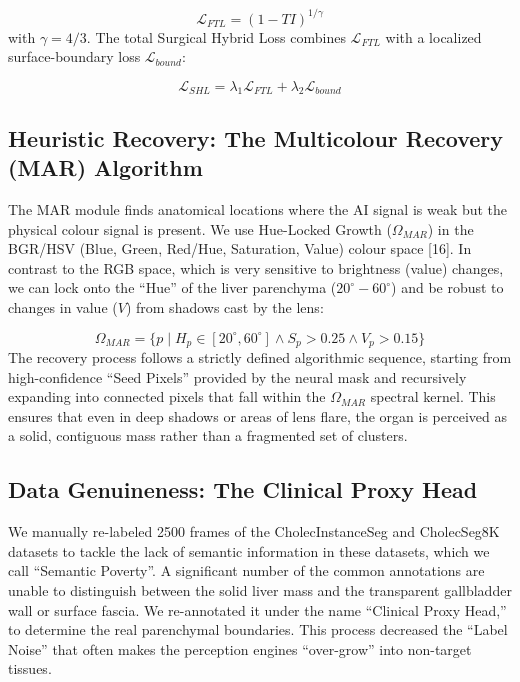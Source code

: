 \documentclass[conference]{IEEEtran}
\begin{document}
\begin{equation}
\mathcal{L}_{FTL} = (1 - TI)^{1/\gamma}
\end{equation}
with $\gamma = 4/3$. The total Surgical Hybrid Loss combines $\mathcal{L}_{FTL}$ with a localized surface-boundary loss $\mathcal{L}_{bound}$:

\begin{equation}
\mathcal{L}_{SHL} = \lambda_1 \mathcal{L}_{FTL} + \lambda_2 \mathcal{L}_{bound}
\end{equation}

\subsection{Heuristic Recovery: The Multicolour Recovery (MAR) Algorithm}
The MAR module finds anatomical locations where the AI signal is weak but the physical colour signal is present. We use Hue-Locked Growth ($\Omega_{MAR}$) in the BGR/HSV (Blue, Green, Red/Hue, Saturation, Value) colour space [16]. In contrast to the RGB space, which is very sensitive to brightness (value) changes, we can lock onto the ``Hue'' of the liver parenchyma ($20^\circ - 60^\circ$) and be robust to changes in value ($V$) from shadows cast by the lens:

\begin{equation}
\Omega_{MAR} = \{ p \mid H_p \in [20^\circ, 60^\circ] \wedge S_p > 0.25 \wedge V_p > 0.15 \}
\end{equation}
The recovery process follows a strictly defined algorithmic sequence, starting from high-confidence ``Seed Pixels'' provided by the neural mask and recursively expanding into connected pixels that fall within the $\Omega_{MAR}$ spectral kernel. This ensures that even in deep shadows or areas of lens flare, the organ is perceived as a solid, contiguous mass rather than a fragmented set of clusters.

\subsection{Data Genuineness: The Clinical Proxy Head}
We manually re-labeled 2500 frames of the CholecInstanceSeg and CholecSeg8K datasets to tackle the lack of semantic information in these datasets, which we call ``Semantic Poverty''. A significant number of the common annotations are unable to distinguish between the solid liver mass and the transparent gallbladder wall or surface fascia. We re-annotated it under the name ``Clinical Proxy Head,'' to determine the real parenchymal boundaries. This process decreased the ``Label Noise'' that often makes the perception engines ``over-grow'' into non-target tissues.
\end{document}
